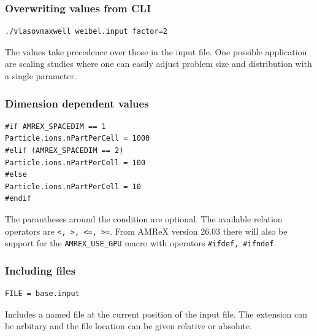 \documentclass[11pt]{article}
\begin{document}
\subsubsection{Overwriting values from CLI}
\begin{lstlisting}[language=pkgconfig]
./vlasovmaxwell weibel.input factor=2
\end{lstlisting}
The values take precedence over those in the input file. One possible application are scaling studies where one can easily adjust problem size and distribution with a single parameter.

\subsubsection{Dimension dependent values}
\begin{lstlisting}[language=pkgconfig]
#if AMREX_SPACEDIM == 1
Particle.ions.nPartPerCell = 1000
#elif (AMREX_SPACEDIM == 2)
Particle.ions.nPartPerCell = 100
#else
Particle.ions.nPartPerCell = 10
#endif
\end{lstlisting}
The parantheses around the condition are optional. The available relation operators are \verb|<, >, <=, >=|. From AMReX version 26.03 there will also be support for the \verb|AMREX_USE_GPU| macro with operators \verb|#ifdef, #ifndef|.

\subsubsection{Including files}
\begin{lstlisting}[language=pkgconfig]
FILE = base.input
\end{lstlisting}
Includes a named file at the current position of the input file. The extension can be arbitary and the file location can be given relative or absolute.
\end{document}
